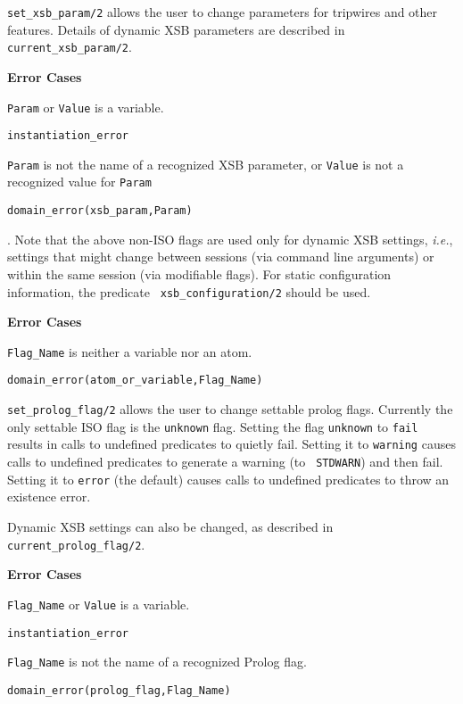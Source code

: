 \begin{description}
%
{\tt set\_xsb\_param/2} allows the user to change parameters for
tripwires and other features.  Details of dynamic XSB parameters are
described in {\tt current\_xsb\_param/2}.

{\bf Error Cases}
\bi
\item 	{\tt Param} or {\tt Value} is a variable.
\bi
\item 	{\tt instantiation\_error}
\ei
%
\item {\tt Param} is not the name of a recognized XSB parameter, or
  {\tt Value} is not a recognized value for {\tt Param}
\bi
\item 	{\tt domain\_error(xsb\_param,Param)}
\ei
\ei

.  
%
Note that the above non-ISO flags are used only for dynamic XSB
settings, {\it i.e.}, settings that might change between sessions (via
command line arguments) or within the same session (via modifiable
flags).  For static configuration information, the predicate {\tt
  xsb\_configuration/2} should be used.

{\bf Error Cases}
\bi
\item 	{\tt Flag\_Name} is neither a variable nor an atom.
\bi
\item 	{\tt domain\_error(atom\_or\_variable,Flag\_Name)}
\ei
\ei

%
{\tt set\_prolog\_flag/2} allows the user to change settable prolog
flags.  Currently the only settable ISO flag is the {\tt unknown}
flag.  Setting the flag {\tt unknown} to {\tt fail} results in calls
to undefined predicates to quietly fail.  Setting it to {\tt warning}
causes calls to undefined predicates to generate a warning (to {\tt
  STDWARN}) and then fail.  Setting it to {\tt error} (the default)
causes calls to undefined predicates to throw an existence error.

Dynamic XSB settings can also be changed, as described in {\tt
  current\_prolog\_flag/2}.

{\bf Error Cases}
\bi
\item 	{\tt Flag\_Name} or {\tt Value} is a variable.
\bi
\item 	{\tt instantiation\_error}
\ei
%
\item 	{\tt Flag\_Name} is not the name of a recognized Prolog flag.
\bi
\item 	{\tt domain\_error(prolog\_flag,Flag\_Name)}
\ei
\ei


\end{description}
